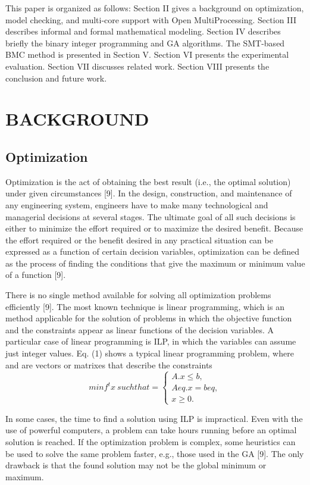 This paper is organized as follows: Section II gives a background on optimization, model checking, and multi-core support with Open MultiProcessing. Section III describes informal and formal mathematical modeling. Section IV describes briefly the binary integer programming and GA algorithms. The SMT-based BMC method is presented in Section V. Section VI presents the experimental evaluation. Section VII discusses related work. Section VIII presents the conclusion and future work.


\section{BACKGROUND}
\subsection{Optimization}
Optimization is the act of obtaining the best result (i.e., the optimal solution) under given circumstances [9]. In the design, construction, and maintenance of any engineering system, engineers have to make many technological and managerial decisions at several stages. The ultimate goal of all such decisions is either to minimize the effort required or to maximize the desired benefit. Because the effort required or the benefit desired in any practical situation can be expressed as a function of certain decision variables, optimization can be defined as the process of finding the conditions that give the maximum or minimum value of a function [9].

There is no single method available for solving all optimization problems efficiently [9]. The most known technique is linear programming, which is an method applicable for the solution of problems in which the objective function and the constraints appear as linear functions of the decision variables. A particular case of linear programming is ILP, in which the variables can assume just integer values. Eq. (1) shows a typical linear programming problem, where  and  are vectors or matrixes that describe the constraints
\begin{equation}
  minf^t x \: such that  = 
  \begin{cases}
    A.x \leq b, \\ 
    Aeq.x = beq, \\ 
    x \geq 0.
  \end{cases}
\end{equation}

In some cases, the time to find a solution using ILP is impractical. Even with the use of powerful computers, a problem can take hours running before an optimal solution is reached. If the optimization problem is complex, some heuristics can be used to solve the same problem faster, e.g., those used in the GA [9]. The only drawback is that the found solution may not be the global minimum or maximum.

